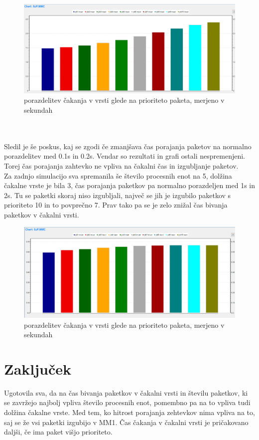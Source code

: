 \documentclass[a4paper,11pt]{article}
\begin{document}
\\
\begin{figure}[ht]
\begin{center}
\includegraphics[scale=0.4]{queue3.png}
\caption{porazdelitev čakanja v vrsti glede na prioriteto paketa, merjeno v sekundah}
\label{Slika2}
\end{center}
\end{figure}
\\
\\
Sledil je še poskus, kaj se zgodi če zmanjšava čas porajanja paketov na normalno porazdelitev med 0.1s in 0.2s. Vendar so rezultati in grafi ostali nespremenjeni. Torej čas porajanja zahtevko ne vpliva na čakalni čas in izgubljanje paketov.\\
Za zadnjo simulacijo sva spremanila še število procesnih enot na 5, dolžina čakalne vrste je bila 3, čas porajanja paketkov pa normalno porazdeljen med 1s in 2s. Tu se paketki skoraj niso izgubljali, največ se jih je izgubilo paketkov s prioriteto 10 in to povprečno 7. Prav tako pa se je zelo znižal čas bivanja paketkov v čakalni vrsti.\\
\begin{figure}[ht]
\begin{center}
\includegraphics[scale=0.4]{queueu3-resource5.png}
\caption{porazdelitev čakanja v vrsti glede na prioriteto paketa, merjeno v sekundah}
\label{Slika2}
\end{center}
\end{figure}


\section{Zaključek}
Ugotovila sva, da na čas bivanja paketkov v čakalni vrsti in številu paketkov, ki se zavržejo najbolj vpliva število procesnih enot, pomembno pa na to vpliva tudi dolžina čakalne vrste. Med tem, ko hitrost porajanja zehtevkov nima vpliva na to, saj se že vsi paketki izgubijo v MM1. Čas čakanja v čakalni vrsti je pričakovano daljši, če ima paket višjo prioriteto. 

\pagebreak


\end{document}
